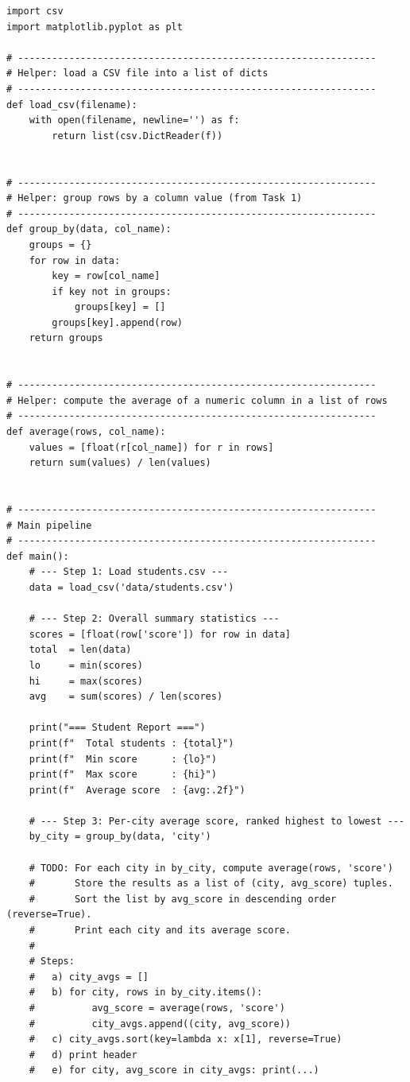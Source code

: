 \documentclass{cslab}
\begin{document}
\begin{lstlisting}
import csv
import matplotlib.pyplot as plt

# ---------------------------------------------------------------
# Helper: load a CSV file into a list of dicts
# ---------------------------------------------------------------
def load_csv(filename):
    with open(filename, newline='') as f:
        return list(csv.DictReader(f))


# ---------------------------------------------------------------
# Helper: group rows by a column value (from Task 1)
# ---------------------------------------------------------------
def group_by(data, col_name):
    groups = {}
    for row in data:
        key = row[col_name]
        if key not in groups:
            groups[key] = []
        groups[key].append(row)
    return groups


# ---------------------------------------------------------------
# Helper: compute the average of a numeric column in a list of rows
# ---------------------------------------------------------------
def average(rows, col_name):
    values = [float(r[col_name]) for r in rows]
    return sum(values) / len(values)


# ---------------------------------------------------------------
# Main pipeline
# ---------------------------------------------------------------
def main():
    # --- Step 1: Load students.csv ---
    data = load_csv('data/students.csv')

    # --- Step 2: Overall summary statistics ---
    scores = [float(row['score']) for row in data]
    total  = len(data)
    lo     = min(scores)
    hi     = max(scores)
    avg    = sum(scores) / len(scores)

    print("=== Student Report ===")
    print(f"  Total students : {total}")
    print(f"  Min score      : {lo}")
    print(f"  Max score      : {hi}")
    print(f"  Average score  : {avg:.2f}")

    # --- Step 3: Per-city average score, ranked highest to lowest ---
    by_city = group_by(data, 'city')

    # TODO: For each city in by_city, compute average(rows, 'score')
    #       Store the results as a list of (city, avg_score) tuples.
    #       Sort the list by avg_score in descending order (reverse=True).
    #       Print each city and its average score.
    #
    # Steps:
    #   a) city_avgs = []
    #   b) for city, rows in by_city.items():
    #          avg_score = average(rows, 'score')
    #          city_avgs.append((city, avg_score))
    #   c) city_avgs.sort(key=lambda x: x[1], reverse=True)
    #   d) print header
    #   e) for city, avg_score in city_avgs: print(...)


\end{lstlisting}
\end{document}
